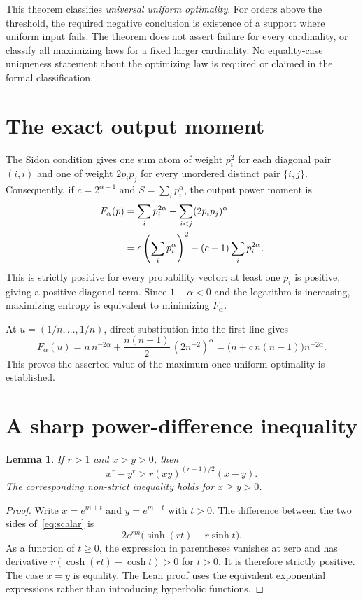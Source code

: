\documentclass[11pt,a4paper]{article}
\newtheorem{lemma}[theorem]{Lemma}
\begin{document}
This theorem classifies \emph{universal uniform optimality}. For orders above
the threshold, the required negative conclusion is existence of a support
where uniform input fails. The theorem does not assert failure for every
cardinality, or classify all maximizing laws for a fixed larger cardinality.
No equality-case uniqueness statement about the optimizing law is required
or claimed in the formal classification.

\section{The exact output moment}

The Sidon condition gives one sum atom of weight $p_i^2$ for each diagonal
pair $(i,i)$ and one of weight $2p_ip_j$ for every unordered distinct pair
\(\{i,j\}\). Consequently, if $c=2^{\alpha-1}$ and
$S=\sum_i p_i^\alpha$, the output power moment is
\begin{align}
F_\alpha(p)
&=\sum_i p_i^{2\alpha}+\sum_{i<j}(2p_ip_j)^\alpha\notag\\
&=c\left(\sum_i p_i^\alpha\right)^2
 -(c-1)\sum_i p_i^{2\alpha}.
\label{eq:moment}
\end{align}
This is strictly positive for every probability vector: at least one $p_i$
is positive, giving a positive diagonal term. Since $1-\alpha<0$ and the
logarithm is increasing, maximizing entropy is equivalent to minimizing
$F_\alpha$.

At $u=(1/n,\ldots,1/n)$, direct substitution into the first line gives
\[
F_\alpha(u)=n\,n^{-2\alpha}
 +\frac{n(n-1)}2\,(2n^{-2})^\alpha
 =\bigl(n+c\,n(n-1)\bigr)n^{-2\alpha}.
\]
This proves the asserted value of the maximum once uniform optimality is
established.

\section{A sharp power-difference inequality}

\begin{lemma}\label{lem:scalar}
If $r>1$ and $x>y>0$, then
\begin{equation}\label{eq:scalar}
x^r-y^r>r(xy)^{(r-1)/2}(x-y).
\end{equation}
The corresponding non-strict inequality holds for $x\ge y>0$.
\end{lemma}

\begin{proof}
Write $x=e^{m+t}$ and $y=e^{m-t}$ with $t>0$. The difference between the two
sides of~\eqref{eq:scalar} is
\[
2e^{rm}\bigl(\sinh(rt)-r\sinh t\bigr).
\]
As a function of $t\ge0$, the expression in parentheses vanishes at zero
and has derivative $r(\cosh(rt)-\cosh t)>0$ for $t>0$.
It is therefore strictly positive. The case $x=y$ is equality.
The Lean proof uses the equivalent exponential expressions rather than
introducing hyperbolic functions.
\end{proof}
\end{document}
